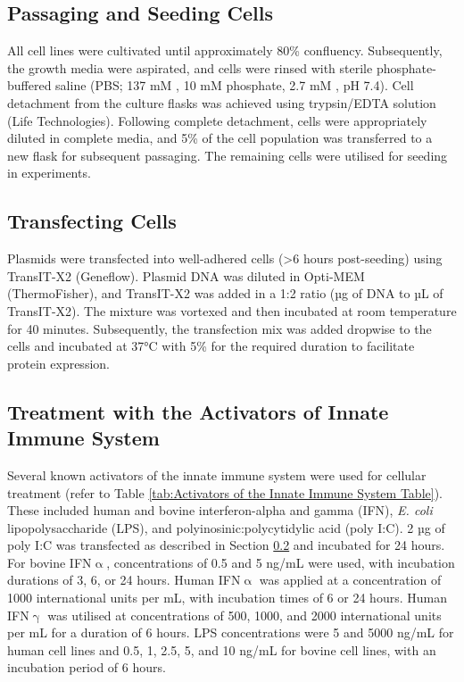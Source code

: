 \subsection{Passaging and Seeding Cells} \label{subsec:Passaging and Seeding Cells}
All cell lines were cultivated until approximately 80\% confluency. Subsequently, the growth media were aspirated, and cells were rinsed with sterile phosphate-buffered saline (PBS; 137 mM , 10 mM phosphate, 2.7 mM , pH 7.4). Cell detachment from the culture flasks was achieved using trypsin/EDTA solution (Life Technologies). Following complete detachment, cells were appropriately diluted in complete media, and 5\% of the cell population was transferred to a new flask for subsequent passaging. The remaining cells were utilised for seeding in experiments.

\subsection{Transfecting Cells} \label{subsec:Transfecting Cells}
Plasmids were transfected into well-adhered cells (>6 hours post-seeding) using TransIT-X2 (Geneflow). Plasmid DNA was diluted in Opti-MEM (ThermoFisher), and TransIT-X2 was added in a 1:2 ratio (µg of DNA to µL of TransIT-X2). The mixture was vortexed and then incubated at room temperature for 40 minutes. Subsequently, the transfection mix was added dropwise to the cells and incubated at 37°C with 5\%  for the required duration to facilitate protein expression.


\subsection{Treatment with the Activators of Innate Immune System} \label{subsec:Treatment with the Activators of Innate Immune System}
Several known activators of the innate immune system were used for cellular treatment (refer to Table \ref{tab:Activators of the Innate Immune System Table}). These included human and bovine interferon-alpha and gamma (IFN), \textit{E. coli} lipopolysaccharide (LPS), and polyinosinic:polycytidylic acid (poly I:C). 2 µg of poly I:C was transfected as described in Section \ref{subsec:Transfecting Cells} and incubated for 24 hours. For bovine IFN$\upalpha$, concentrations of 0.5 and 5 ng/mL were used, with incubation durations of 3, 6, or 24 hours. Human IFN$\upalpha$ was applied at a concentration of 1000 international units per mL, with incubation times of 6 or 24 hours. Human IFN$\upgamma$ was utilised at concentrations of 500, 1000, and 2000 international units per mL for a duration of 6 hours. LPS concentrations were 5 and 5000 ng/mL for human cell lines and 0.5, 1, 2.5, 5, and 10 ng/mL for bovine cell lines, with an incubation period of 6 hours.


